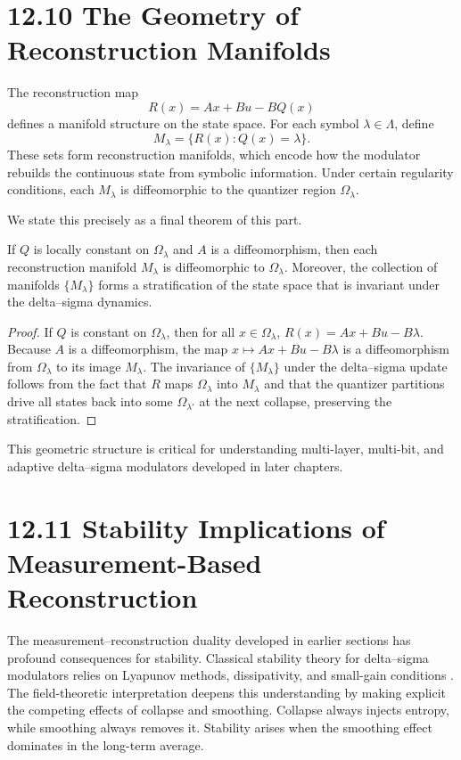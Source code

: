 \section*{12.10 The Geometry of Reconstruction Manifolds}

The reconstruction map
\[
R(x) = A x + B u - B Q(x)
\]
defines a manifold structure on the state space. For each symbol $\lambda \in \Lambda$, define
\[
M_{\lambda} = \{ R(x) : Q(x) = \lambda \}.
\]
These sets form reconstruction manifolds, which encode how the modulator rebuilds the continuous state from symbolic information. Under certain regularity conditions, each $M_{\lambda}$ is diffeomorphic to the quantizer region $\Omega_{\lambda}$.

We state this precisely as a final theorem of this part.

\begin{theorem}
If $Q$ is locally constant on $\Omega_{\lambda}$ and $A$ is a diffeomorphism, then each reconstruction manifold $M_{\lambda}$ is diffeomorphic to $\Omega_{\lambda}$. Moreover, the collection of manifolds $\{M_{\lambda}\}$ forms a stratification of the state space that is invariant under the delta--sigma dynamics.
\end{theorem}

\begin{proof}
If $Q$ is constant on $\Omega_{\lambda}$, then for all $x \in \Omega_{\lambda}$, $R(x) = A x + B u - B \lambda$. Because $A$ is a diffeomorphism, the map $x \mapsto A x + B u - B \lambda$ is a diffeomorphism from $\Omega_{\lambda}$ to its image $M_{\lambda}$. The invariance of $\{M_{\lambda}\}$ under the delta--sigma update follows from the fact that $R$ maps $\Omega_{\lambda}$ into $M_{\lambda}$ and that the quantizer partitions drive all states back into some $\Omega_{\lambda'}$ at the next collapse, preserving the stratification.
\end{proof}

This geometric structure is critical for understanding multi-layer, multi-bit, and adaptive delta--sigma modulators developed in later chapters.

\section*{12.11 Stability Implications of Measurement-Based Reconstruction}

The measurement--reconstruction duality developed in earlier sections has profound consequences for stability. Classical stability theory for delta--sigma modulators relies on Lyapunov methods, dissipativity, and small-gain conditions \cite{khalil2002nonlinear, vidyasagar1993nonlinear}. The field-theoretic interpretation deepens this understanding by making explicit the competing effects of collapse and smoothing. Collapse always injects entropy, while smoothing always removes it. Stability arises when the smoothing effect dominates in the long-term average.

